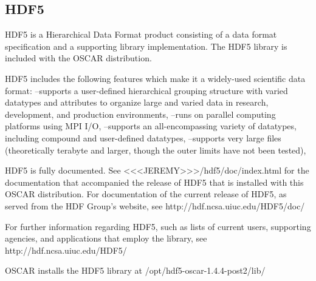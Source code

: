 %
%
%

\subsection{HDF5}
\label{app:hdf5-overview}

HDF5 is a Hierarchical Data Format product consisting of a data format 
specification and a supporting library implementation. The HDF5 library
is included with the OSCAR distribution.


HDF5 includes the following features which make it a widely-used 
scientific data format:
   --supports a user-defined hierarchical grouping structure with 
     varied datatypes and attributes to organize large and varied data 
         in research, development, and production environments,
   --runs on parallel computing platforms using MPI I/O,
   --supports an all-encompassing variety of datatypes, including 
         compound and user-defined datatypes,
   --supports very large files (theoretically terabyte and larger, 
         though the outer limits have not been tested), 


HDF5 is fully documented.  See
   <<<JEREMY>>>/hdf5/doc/index.html
   for the documentation that accompanied the release of HDF5 that is
   installed with this OSCAR distribution. 
For documentation of the current release of HDF5, as served from the 
   HDF Group's website, see
   http://hdf.ncsa.uiuc.edu/HDF5/doc/


For further information regarding HDF5, such as lists of current users,
supporting agencies, and applications that employ the library, see
    http://hdf.ncsa.uiuc.edu/HDF5/


OSCAR installs the HDF5 library at /opt/hdf5-oscar-1.4.4-post2/lib/

